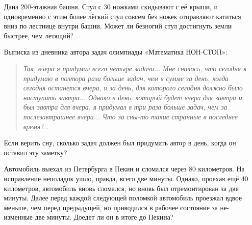﻿

\begin{itemize}
\itA Дана 200-этажная башня. Стул с 30 ножками скидывают с её крыши, и одновременно с этим более лёгкий стул совсем без ножек отправляют катиться вниз по лестнице внутри башни. Может ли безногий стул достигнуть земли быстрее, чем летящий?

\itB Выписка из дневника автора задач олимпиады «Математика НОН-СТОП»:

\begin{quote}
\itshape Так, вчера я придумал всего четыре задачи... Мне снилось, что сегодня я придумаю в полтора раза больше задач, чем в сумме за день, когда сегодня останется вчера, и за день, для которого сегодня должно было наступить завтра... Однако в день, который будет вчера для завтра и был завтра для вчера, я придумал в три раза больше задач, чем за послезавтрашнее вчера... Что за сны-то такие странные в последнее время?..
\end{quote}

\noindent Если верить сну, сколько задач должен был придумать автор в день, когда он оставил эту заметку?

\itC Автомобиль выехал из Петербурга в Пекин и сломался через 80 километров. На исправление неполадок ушло, правда, всего две минуты. Однако, проехав ещё 40 километров, автомобиль вновь сломался, но вновь был отремонтирован за две минуты. Далее перед каждой следующей поломкой автомобиль проезжал вдвое меньше, чем перед предыдущей, но приводился в рабочее состояние за не- изменные две минуты. Доедет ли он в итоге до Пекина?
\end{itemize}